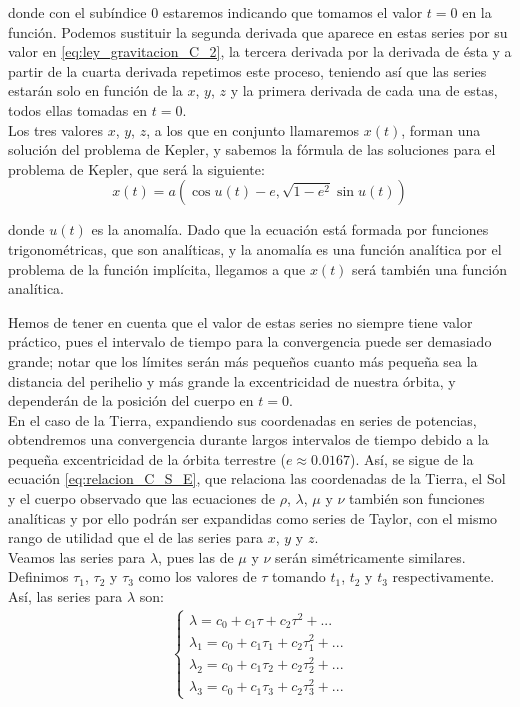 \documentclass[11pt]{article}
\begin{document}
\noindent donde con el subíndice 0 estaremos indicando que tomamos el valor $t=0$ en la función. Podemos sustituir la segunda derivada que aparece en estas series por su valor en \eqref{eq:ley_gravitacion_C_2}, la tercera derivada por la derivada de ésta y a partir de la cuarta derivada repetimos este proceso, teniendo así que las series estarán solo en función de la $x$, $y$, $z$ y la primera derivada de cada una de estas, todos ellas tomadas en $t=0$.\\

Los tres valores $x$, $y$, $z$, a los que en conjunto llamaremos $x(t)$, forman una solución del problema de Kepler, y sabemos la fórmula de las soluciones para el problema de Kepler, que será la siguiente:
\[
x(t)=a(\cos{u(t)}-e,\sqrt{1-e^2}\sin{u(t)})
\]

\noindent donde $u(t)$ es la anomalía. Dado que la ecuación está formada por funciones trigonométricas, que son analíticas, y la anomalía es una función analítica por el problema de la función implícita, llegamos a que $x(t)$ será también una función analítica.


Hemos de tener en cuenta que el valor de estas series no siempre tiene valor práctico, pues el intervalo de tiempo para la convergencia puede ser demasiado grande; notar que los límites serán más pequeños cuanto más pequeña sea la distancia del perihelio y más grande la excentricidad de nuestra órbita, y dependerán de la posición del cuerpo en $t=0$.\\

En el caso de la Tierra, expandiendo sus coordenadas en series de potencias, obtendremos una convergencia durante largos intervalos de tiempo debido a la pequeña excentricidad de la órbita terrestre ($e\approx0.0167$). Así, se sigue de la ecuación \eqref{eq:relacion_C_S_E}, que relaciona las coordenadas de la Tierra, el Sol y el cuerpo observado que las ecuaciones de $\rho$, $\lambda$, $\mu$ y $\nu$ también son funciones analíticas y por ello podrán ser expandidas como series de Taylor, con el mismo rango de utilidad que el de las series para $x$, $y$ y $z$.\\

Veamos las series para $\lambda$, pues las de $\mu$ y $\nu$ serán simétricamente similares. Definimos $\tau_1$, $\tau_2$ y $\tau_3$ como los valores de $\tau$ tomando $t_1$, $t_2$ y $t_3$ respectivamente. Así, las series para $\lambda$ son:
\begin{align}
\left\{
\begin{array}{l}
\lambda=c_0+c_1\tau+c_2\tau^2+...\\
\lambda_1=c_0+c_1\tau_1+c_2\tau_1^2+...\\
\lambda_2=c_0+c_1\tau_2+c_2\tau_2^2+...\\
\lambda_3=c_0+c_1\tau_3+c_2\tau_3^2+...
\end{array}
\right.
\label{eq:series_lambda}
\end{align}
\end{document}
